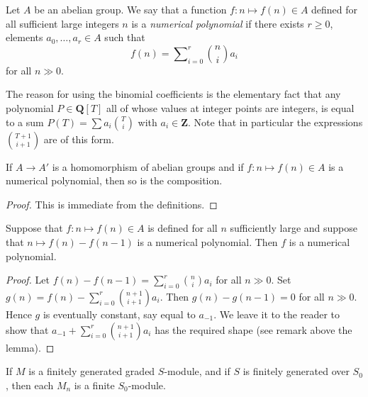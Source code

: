 \begin{definition}
\label{definition-numerical-polynomial}
Let $A$ be an abelian group.
We say that a function $f : n \mapsto f(n) \in A$
defined for all sufficient large integers $n$ is a
{\it numerical polynomial} if there exists $r \geq 0$,
elements $a_0, \ldots, a_r\in A$ such that
$$
f(n) = \sum\nolimits_{i = 0}^r \binom{n}{i} a_i
$$
for all $n \gg 0$.
\end{definition}

\noindent
The reason for using the binomial coefficients is the
elementary fact that any polynomial $P \in \mathbf{Q}[T]$
all of whose values at integer points are integers, is
equal to a sum $P(T) = \sum a_i \binom{T}{i}$ with
$a_i \in \mathbf{Z}$. Note that in particular the
expressions $\binom{T + 1}{i + 1}$ are of this form.

\begin{lemma}
\label{lemma-numerical-polynomial-functorial}
If $A \to A'$ is a homomorphism of abelian groups and if
$f : n \mapsto f(n) \in A$ is a numerical polynomial,
then so is the composition.
\end{lemma}

\begin{proof}
This is immediate from the definitions.
\end{proof}

\begin{lemma}
\label{lemma-numerical-polynomial}
Suppose that $f: n \mapsto f(n) \in A$
is defined for all $n$ sufficiently large
and suppose that $n \mapsto f(n) - f(n-1)$
is a numerical polynomial. Then $f$ is a
numerical polynomial.
\end{lemma}

\begin{proof}
Let $f(n) - f(n-1) = \sum\nolimits_{i = 0}^r \binom{n}{i} a_i$
for all $n \gg 0$. Set
$g(n) = f(n) - \sum\nolimits_{i = 0}^r \binom{n + 1}{i + 1} a_i$.
Then $g(n) - g(n-1) = 0$ for all $n \gg 0$. Hence $g$ is
eventually constant, say equal to $a_{-1}$. We leave it
to the reader to show that
$a_{-1} + \sum\nolimits_{i = 0}^r \binom{n + 1}{i + 1} a_i$
has the required shape (see remark above the lemma).
\end{proof}

\begin{lemma}
\label{lemma-graded-module-fg}
If $M$ is a finitely generated graded $S$-module,
and if $S$ is finitely generated over $S_0$, then
each $M_n$ is a finite $S_0$-module.
\end{lemma}

